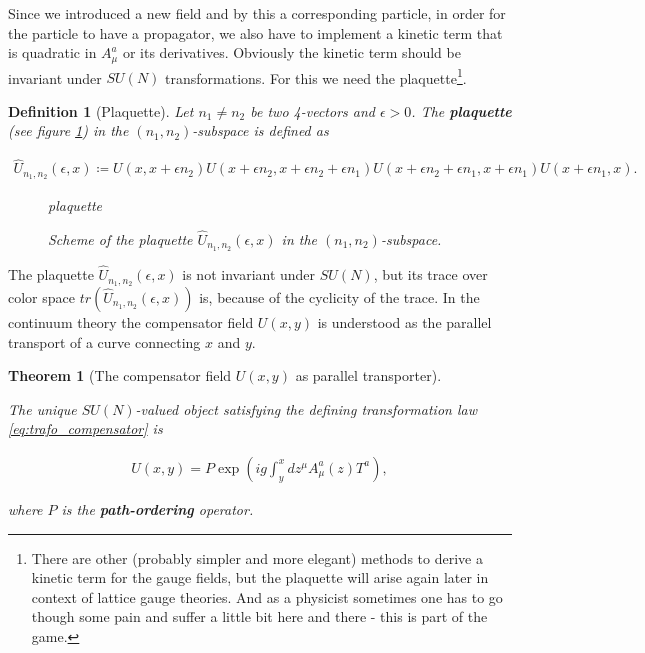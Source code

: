 \documentclass{article}
\theoremstyle{plain} %
\newtheorem{theorem}{Theorem}[section]
\newtheorem{definition}{Definition}[section]
\theoremstyle{convention} %
\theoremstyle{remark} %
\def\df#1{\textbf{\textit{#1}}}
\numberwithin{equation}{section}
\begin{document}
Since we introduced a new field and by this a corresponding particle, in order for the particle to have a propagator, we also have to implement a kinetic term that is quadratic in $A_{\mu}^a$ or its derivatives. Obviously the kinetic term should be invariant under $SU(N)$ transformations. For this we need the plaquette\footnote{There are other (probably simpler and more elegant) methods to derive a kinetic term for the gauge fields, but the plaquette will arise again later in context of lattice gauge theories. And as a physicist sometimes one has to go though some pain and suffer a little bit here and there - this is part of the game.}.

\begin{definition}[Plaquette]

Let $n_1 \neq n_2$ be two 4-vectors and $\epsilon > 0$. The \df{plaquette} (see figure \ref{fig:plaquette}) in the $(n_1, n_2)$-subspace is defined as 

\begin{align}
    \hat{U}_{n_1,n_2}(\epsilon,x) \coloneqq U(x, x + \epsilon n_2) U(x + \epsilon n_2, x + \epsilon n_2 + \epsilon n_1) U(x + \epsilon n_2 + \epsilon n_1, x + \epsilon n_1) U(x + \epsilon n_1, x).
\end{align}

\begin{figure}[H]
  \centering
  {plaquette}
  \caption{Scheme of the plaquette $\hat{U}_{n_1,n_2}(\epsilon,x)$ in the $(n_1, n_2)$-subspace.}
  \label{fig:plaquette}
\end{figure}

\end{definition}

The plaquette $\hat{U}_{n_1,n_2}(\epsilon,x)$ is not invariant under $SU(N)$, but its trace over color space $tr(\hat{U}_{n_1,n_2}(\epsilon,x))$ is, because of the cyclicity of the trace. In the continuum theory the compensator field $U(x,y)$ is understood as the parallel transport of a curve connecting $x$ and $y$.

\begin{theorem}[The compensator field $U(x,y)$ as parallel transporter]

\label{thm:pexp}

The unique $SU(N)$-valued object satisfying the defining transformation law \eqref{eq:trafo_compensator} is

\begin{align}
    U(x,y) = P \exp( ig \int_{y}^{x} d z^{\mu} A_{\mu}^a(z) T^a ), \label{eq:realu}
\end{align}

where $P$ is the \df{path-ordering} operator.

\end{theorem}
\end{document}
